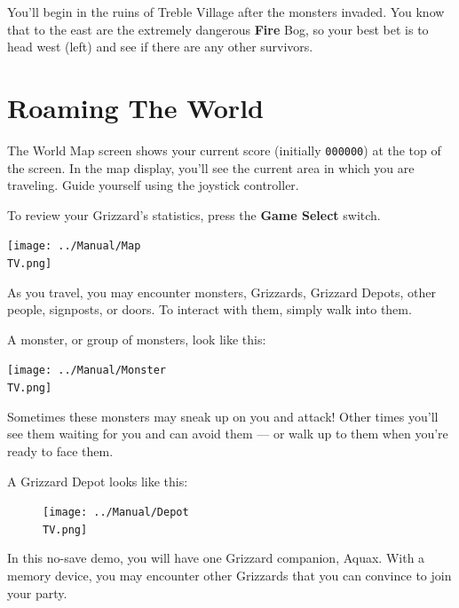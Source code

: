 \documentclass[10pt,twocolumn,openany,article]{memoir}
\newcommand\TV{NTSC}
\newcommand\TV{PAL}
\newcommand\TV{SECAM}
\begin{document}
\fi

You'll begin in the ruins of  Treble Village after the monsters invaded.
You know that to the east are  the extremely dangerous \textbf{Fire} Bog, so your
best  bet   is  to  head   west  (left)  and   see  if  there   are  any
other survivors.

\section{Roaming The World}

The   World   Map   screen   shows   your   current   score   (initially
\texttt{000000}) at  the top of the  screen. In the map  display, you'll
see the  current area in which  you are traveling. Guide  yourself using
the joystick controller.

To   review  your   Grizzard's   statistics,   press  the   \textbf{Game
  Select} switch.

\begin{center}
  \texttt{[image: ../Manual/Map\\TV.png]}
\end{center}

As  you   travel,  you  may   encounter  monsters,\ifdefined\NOSAVE\else
Grizzards,  \fi  Grizzard Depots,  other  people,  signposts, or  doors.
To interact with them, simply walk into them.

A  monster,  or group  of  monsters,  look  like this:

\begin{center}
  \texttt{[image: ../Manual/Monster\\TV.png]}
\end{center}

Sometimes these  monsters may sneak  up on  you and attack!  Other times
you'll see  them waiting for you  and can avoid  them --- or walk  up to
them when you're ready to face them.

A Grizzard Depot looks like this:

\begin{figure}[t]
  \begin{center}
    \texttt{[image: ../Manual/Depot\\TV.png]}
  \end{center}
\end{figure}

\ifdefined\NOSAVE

In  this no-save  demo, you  will  have one  Grizzard companion,  Aquax.
With a  memory device, you  may encounter  other Grizzards that  you can
convince to join your party.
\end{document}
